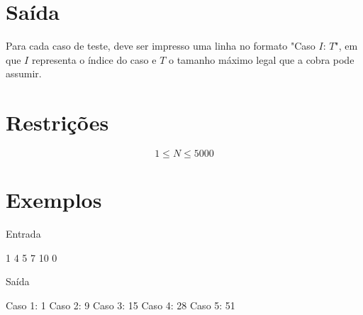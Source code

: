 \section*{Saída}

Para cada caso de teste, deve ser impresso uma linha no formato "Caso $I$: $T$", em que $I$ representa o índice do caso e $T$ o tamanho máximo legal que a cobra pode assumir.

\section*{Restrições}

$$1 \leq N \leq 5000$$

\section*{Exemplos}

Entrada

1
4
5
7
10
0

Saída

Caso 1: 1
Caso 2: 9
Caso 3: 15
Caso 4: 28
Caso 5: 51
\exemplo
